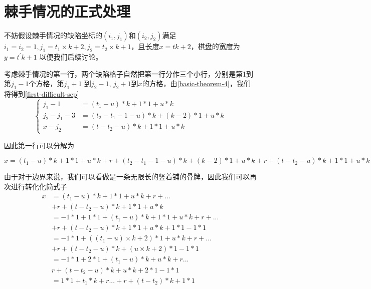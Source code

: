 \section{棘手情况的正式处理}
不妨假设棘手情况的缺陷坐标的$(i_1, j_1)$和$(i_2, j_2)$满足$i_1 = i_2 = 1, j_1 = t_1 \times k + 2, j_2 = t_2 \times k + 1$，且长度$x = tk + 2$，棋盘的宽度为$y = t^{'}k + 1$ 以便我们后续讨论。

考虑棘手情况的第一行，两个缺陷格子自然把第一行分作三个小行，分别是第1到第$j_1 - 1$个方格，第$j_1 + 1$ 到$j_2 - 1$, $j_2 + 1$到$x$的方格，由\ref*{basic-theorem-4}，我们将得到\ref*{first-difficult-sep}
$$
    \left\{
    \begin{aligned}
        j_1 - 1       & = (t_1 - u) * k  + 1 * 1 + u * k                 \\
        j_2 - j_1 - 3 & = (t_2 - t_1 - 1 - u) * k  + (k - 2) * 1 + u * k \\
        x - j_2       & = (t - t_2 - u) * k  + 1 * 1 + u * k
        \label{first-difficult-sep}
    \end{aligned}
    \right.
$$

因此第一行可以分解为

$x = (t_1 - u) * k  + 1 * 1 + u * k + r +  (t_2 - t_1 - 1 - u) * k  + (k - 2) * 1 + u * k + r + (t - t_2 - u) * k  + 1 * 1 + u * k$

由于对于边界来说，我们可以看做是一条无限长的竖着铺的骨牌，因此我们可以再次进行转化化简式子
$$
    \begin{aligned}
        x & = (t_1 - u) * k  + 1 * 1 + u * k + r + ...                  \\
          & + r + (t - t_2 - u) * k  + 1 * 1 + u * k                    \\
          & = -1 * 1 + 1 * 1 + (t_1 - u) * k  + 1 * 1 + u * k + r + ... \\
          & + r + (t - t_2 - u) * k  + 1 * 1 + u * k + 1 * 1 - 1 * 1    \\
          & = -1 * 1 + ((t_1 - u) \times k  + 2)  * 1 + u * k + r + ... \\
          & + r + (t - t_2 - u) * k  +  (u \times k + 2) * 1 - 1 * 1    \\
          & = -1 * 1 + 2 * 1 + (t_1 - u) * k  + u * k + r ...           \\
          & r + (t - t_2 - u) * k  +  u * k + 2 * 1 - 1 * 1             \\
          & = 1 * 1 +  t_1 * k + r ... + r + (t - t_2) * k + 1 * 1
    \end{aligned}
$$

